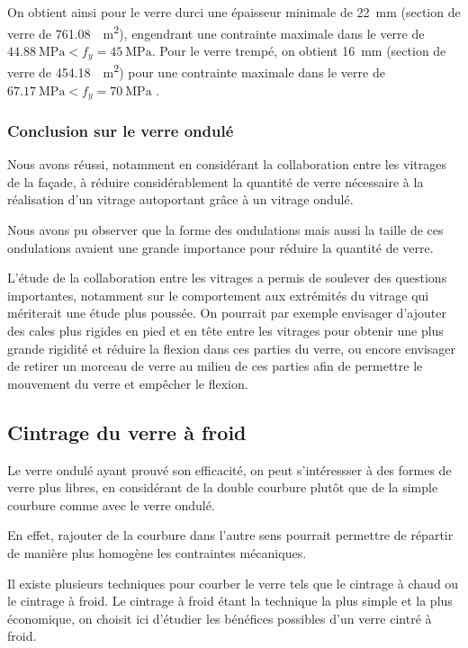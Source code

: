 \documentclass[11pt,titlepage]{article}
\begin{document}
On obtient ainsi pour le verre durci une épaisseur minimale de \qty{22}{\milli\meter} (section de verre de \qty{761.08}{\centi\square\meter}), engendrant une contrainte maximale dans le verre de $\qty{44.88}{\mega\pascal} < f_y = \qty{45}{\mega\pascal}$. Pour le verre trempé, on obtient \qty{16}{\milli\meter} (section de verre de \qty{454.18}{\centi\square\meter}) pour une contrainte maximale dans le verre de $\qty{67.17}{\mega\pascal} < f_y = \qty{70}{\mega\pascal}$ .

\subsubsection{Conclusion sur le verre ondulé}

Nous avons réussi, notamment en considérant la collaboration entre les vitrages de la façade, à réduire considérablement la quantité de verre nécessaire à la réalisation d'un vitrage autoportant grâce à un vitrage ondulé. 

Nous avons pu observer que la forme des ondulations mais aussi la taille de ces ondulations avaient une grande importance pour réduire la quantité de verre. 

L'étude de la collaboration entre les vitrages a permis de soulever des questions importantes, notamment sur le comportement aux extrémités du vitrage qui mériterait une étude plus poussée. On pourrait par exemple envisager d'ajouter des cales plus rigides en pied et en tête entre les vitrages pour obtenir une plus grande rigidité et réduire la flexion dans ces parties du verre, ou encore envisager de retirer un morceau de verre au milieu de ces parties afin de permettre le mouvement du verre et empêcher le flexion.

\newpage
\subsection{Cintrage du verre à froid}

Le verre ondulé ayant prouvé son efficacité, on peut s'intéressser à des formes de verre plus libres, en considérant de la double courbure plutôt que de la simple courbure comme avec le verre ondulé.

En effet, rajouter de la courbure dans l'autre sens pourrait permettre de répartir de manière plus homogène les contraintes mécaniques.

Il existe plusieurs techniques pour courber le verre tels que le cintrage à chaud ou le cintrage à froid. Le cintrage à froid étant la technique la plus simple et la plus économique, on choisit ici d'étudier les bénéfices possibles d'un verre cintré à froid. 
\end{document}
